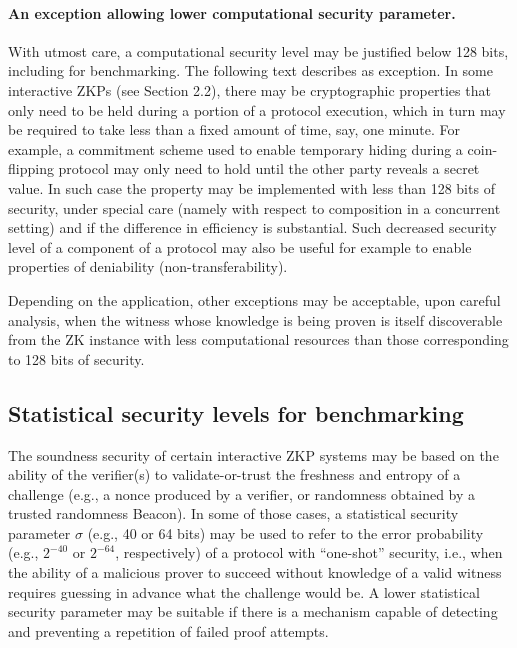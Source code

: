 \paragraph{An exception allowing lower computational security parameter.}
\label{par:security:efficiency:comp-sec-levels:exception}

	With utmost care, a computational security level may be justified below 128 bits, including for benchmarking.
	The following text describes as exception.
	In some interactive ZKPs (see Section 2.2), there may be cryptographic properties that only need to be held during a portion of a protocol execution, which in turn may be required to take less than a fixed amount of time, say, one minute.
	For example, a commitment scheme used to enable temporary hiding during a coin-flipping protocol may only need to hold until the other party reveals a secret value.
	In such case the property may be implemented with less than 128 bits of security, under special care (namely with respect to composition in a concurrent setting) and if the difference in efficiency is substantial.
	Such decreased security level of a component of a protocol may also be useful for example to enable properties of deniability (non-transferability).

    Depending on the application, other exceptions may be acceptable, upon careful analysis, when the witness whose knowledge is being proven is itself discoverable from the ZK instance with less computational resources than those corresponding to 128 bits of security. 



\subsection{Statistical security levels for benchmarking}
\label{security:efficiency:stat-sec-levels}


	The soundness security of certain interactive ZKP systems may be based on the ability of the verifier(s) to validate-or-trust the freshness and entropy of a challenge (e.g., a nonce produced by a verifier, or randomness obtained by a trusted randomness Beacon).
	In some of those cases, a statistical security parameter $\sigma$ (e.g., 40 or 64 bits) may be used to refer to the error probability (e.g., $2^{-40}$ or $2^{-64}$, respectively) of a protocol with ``one-shot'' security, i.e., when the ability of a malicious prover to succeed without knowledge of a valid witness requires guessing in advance what the challenge would be.
	A lower statistical security parameter may be suitable if there is a mechanism capable of detecting and preventing a repetition of failed proof attempts.

